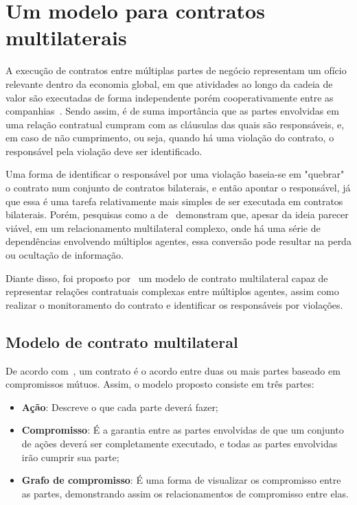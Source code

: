 \section{Um modelo para contratos multilaterais}

A execução de contratos entre múltiplas partes de negócio representam um ofício relevante dentro da economia global, em que atividades ao longo da cadeia de valor são executadas de forma independente porém cooperativamente entre as companhias~\cite{xu2004monitoring}. Sendo assim, é de suma importância que as partes envolvidas em uma relação contratual cumpram com as cláusulas das quais são responsáveis, e, em caso de não cumprimento, ou seja, quando há uma violação do contrato, o responsável pela violação deve ser identificado.

Uma forma de identificar o responsável por uma violação baseia-se em "quebrar" o contrato num conjunto de contratos bilaterais, e então apontar o responsável, já que essa é uma tarefa relativamente mais simples de ser executada em contratos bilaterais. Porém, pesquisas como a de~\citeauthor{haugen2002multi} demonstram que, apesar da ideia parecer viável, em um relacionamento multilateral complexo, onde há uma série de dependências envolvendo múltiplos agentes, essa conversão pode resultar na perda ou ocultação de informação.

Diante disso, foi proposto por~\citeauthor{xu2004multi} um modelo de contrato multilateral capaz de representar relações contratuais complexas entre múltiplos agentes, assim como realizar o monitoramento do contrato e identificar os responsáveis por violações.


\subsection*{Modelo de contrato multilateral}

De acordo com~\citeauthor{xu2004multi}, um contrato é o acordo entre duas ou mais partes baseado em compromissos mútuos. Assim, o modelo proposto consiste em três partes:
\begin{itemize}
	\item \textbf{Ação}: Descreve o que cada parte deverá fazer;
	\item \textbf{Compromisso}: É a garantia entre as partes envolvidas de que um conjunto de ações deverá ser completamente executado, e todas as partes envolvidas irão cumprir sua parte;
	\item \textbf{Grafo de compromisso}: É uma forma de visualizar os compromisso entre as partes, demonstrando assim os relacionamentos de compromisso entre elas.
\end{itemize}

